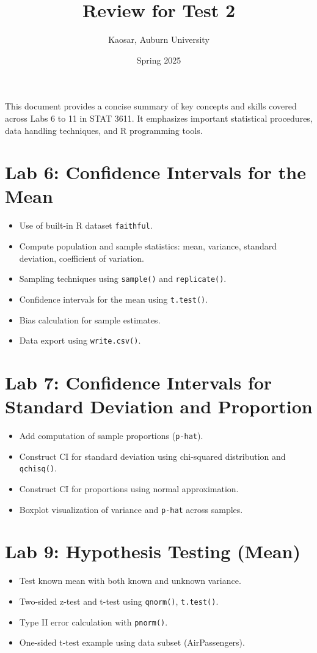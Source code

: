\documentclass{article}
\begin{document}
\title{Review for Test 2}
\author{Kaosar, Auburn University}
\date{Spring 2025}
\maketitle
This document provides a concise summary of key concepts and skills covered across Labs 6 to 11 in STAT 3611. It emphasizes important statistical procedures, data handling techniques, and R programming tools.

\section*{Lab 6: Confidence Intervals for the Mean}
\begin{itemize}
  \item Use of built-in R dataset \texttt{faithful}.
  \item Compute population and sample statistics: mean, variance, standard deviation, coefficient of variation.
  \item Sampling techniques using \texttt{sample()} and \texttt{replicate()}.
  \item Confidence intervals for the mean using \texttt{t.test()}.
  \item Bias calculation for sample estimates.
  \item Data export using \texttt{write.csv()}.
\end{itemize}

\section*{Lab 7: Confidence Intervals for Standard Deviation and Proportion}
\begin{itemize}
  \item Add computation of sample proportions (\texttt{p-hat}).
  \item Construct CI for standard deviation using chi-squared distribution and \texttt{qchisq()}.
  \item Construct CI for proportions using normal approximation.
  \item Boxplot visualization of variance and \texttt{p-hat} across samples.
\end{itemize}

\section*{Lab 9: Hypothesis Testing (Mean)}
\begin{itemize}
  \item Test known mean with both known and unknown variance.
  \item Two-sided z-test and t-test using \texttt{qnorm()}, \texttt{t.test()}.
  \item Type II error calculation with \texttt{pnorm()}.
  \item One-sided t-test example using data subset (AirPassengers).
\end{itemize}
\end{document}
